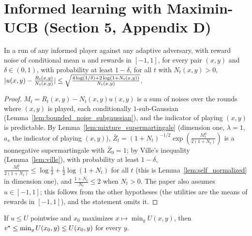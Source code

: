\chapter{Informed learning with Maximin-UCB (Section 5, Appendix D)}
\label{chap:maximin_ucb}

\begin{lemma}
  \label{lem:ucb_ucb}
  \leanok
  In a run of any informed player against any adaptive adversary, with reward noise of conditional
  mean $u$ and rewards in $[-1, 1]$, for every pair $(x, y)$ and $\delta \in (0, 1)$, with probability
  at least $1 - \delta$, for all $t$ with $N_t(x, y) > 0$,
  $\lvert u(x, y) - \frac{R_t(x, y)}{N_t(x, y)} \rvert \le \sqrt{\frac{4 \log(1/\delta) + 2 \log(1 + N_t(x,
  y))}{N_t(x, y)}}$.
\end{lemma}

\begin{proof}
  \leanok
  $M_t = R_t(x, y) - N_t(x, y) u(x, y)$ is a sum of noises over the rounds where $(x, y)$ is played,
  each conditionally $1$-sub-Gaussian (Lemma~\ref{lem:bounded_noise_subgaussian}), and the
  indicator of playing $(x, y)$ is predictable. By Lemma~\ref{lem:mixture_supermartingale}
  (dimension one, $\lambda = 1$, $a_s$ the indicator of playing $(x, y)$),
  $\bar Z_t = (1 + N_t)^{-1/2} \exp(\frac{M_t^2}{2(1 + N_t)})$ is a nonnegative supermartingale with
  $\bar Z_0 = 1$; by Ville's inequality (Lemma~\ref{lem:ville}), with probability at least
  $1 - \delta$, $\frac{M_t^2}{2(1 + N_t)} \le \log\frac1\delta + \frac12 \log(1 + N_t)$ for all $t$
  (this is Lemma~\ref{lem:self_normalized} in dimension one), and $\frac{1 + N_t}{N_t} \le 2$ when
  $N_t > 0$. The paper also assumes $u \in [-1, 1]$; this follows from the other hypotheses (the
  utilities are the means of rewards in $[-1, 1]$), and the statement omits it.
\end{proof}

\begin{lemma}
  \label{lem:maximin_optimism}
  \leanok
  If $u \le U$ pointwise and $x_0$ maximizes $x \mapsto \min_y U(x, y)$, then
  $v^\star \le \min_y U(x_0, y) \le U(x_0, y)$ for every $y$.
\end{lemma}

